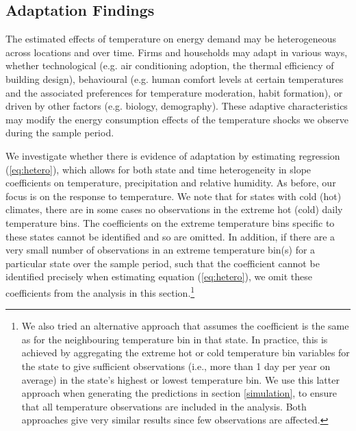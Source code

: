 \documentclass[11pt]{article}
\begin{document}
\subsection{Adaptation Findings \label{resultsb}}

The estimated effects of temperature on energy demand may be heterogeneous across locations and over time. Firms and households may adapt in various ways, whether technological (e.g. air conditioning adoption, the thermal efficiency of building design), behavioural (e.g. human comfort levels at certain temperatures and the associated preferences for temperature moderation, habit formation), or driven by other factors (e.g. biology, demography). These adaptive characteristics may modify the energy consumption effects of the temperature shocks we observe during the sample period.

We investigate whether there is evidence of adaptation by estimating regression (\ref{eq:hetero}), which allows for both state and time heterogeneity in slope coefficients on temperature, precipitation and relative humidity. As before, our focus is on the response to temperature. We note that for states with cold (hot) climates, there are in some cases no observations in the extreme hot (cold) daily temperature bins. The coefficients on the extreme temperature bins specific to these states cannot be identified and so are omitted. In addition, if there are a very small number of observations in an extreme temperature bin(s) for a particular state over the sample period, such that the coefficient cannot be identified precisely when estimating equation (\ref{eq:hetero}), we omit these coefficients from the analysis in this section.\footnote{ We also tried an alternative approach that assumes the coefficient is the same as for the neighbouring temperature bin in that state. In practice, this is achieved by aggregating the extreme hot or cold temperature bin variables for the state to give sufficient observations (i.e., more than 1 day per year on average) in the state's highest or lowest temperature bin. We use this latter approach when generating the predictions in section \ref{simulation}, to ensure that all temperature observations are included in the analysis. Both approaches give very similar results since few observations are affected.} 
\end{document}

